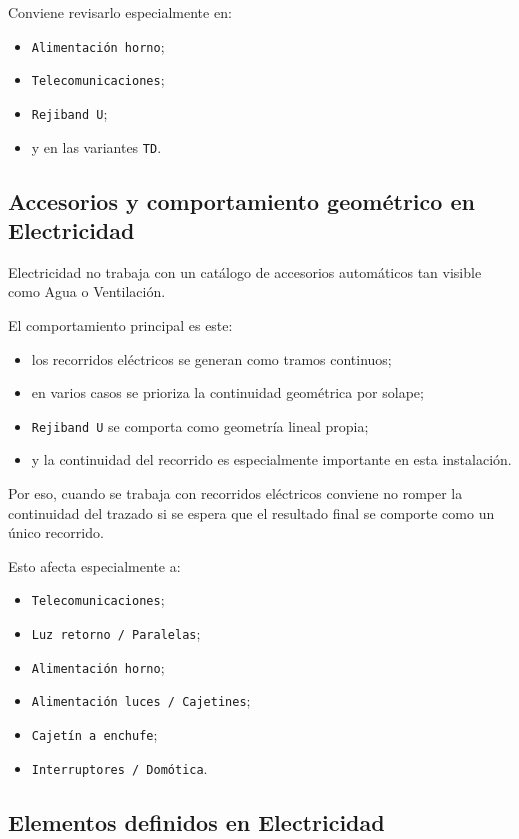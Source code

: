 \documentclass[12pt,a4paper]{article}
\begin{document}
Conviene revisarlo especialmente en:

\begin{itemize}
\item \texttt{Alimentación horno};
\item \texttt{Telecomunicaciones};
\item \texttt{Rejiband U};
\item y en las variantes \texttt{TD}.
\end{itemize}

\subsection{Accesorios y comportamiento geométrico en Electricidad}

Electricidad no trabaja con un catálogo de accesorios automáticos tan visible como Agua o Ventilación.

El comportamiento principal es este:

\begin{itemize}
\item los recorridos eléctricos se generan como tramos continuos;
\item en varios casos se prioriza la continuidad geométrica por solape;
\item \texttt{Rejiband U} se comporta como geometría lineal propia;
\item y la continuidad del recorrido es especialmente importante en esta instalación.
\end{itemize}

Por eso, cuando se trabaja con recorridos eléctricos conviene no romper la continuidad del trazado si se espera que el resultado final se comporte como un único recorrido.

Esto afecta especialmente a:

\begin{itemize}
\item \texttt{Telecomunicaciones};
\item \texttt{Luz retorno / Paralelas};
\item \texttt{Alimentación horno};
\item \texttt{Alimentación luces / Cajetines};
\item \texttt{Cajetín a enchufe};
\item \texttt{Interruptores / Domótica}.
\end{itemize}

\subsection{Elementos definidos en Electricidad}
\end{document}

